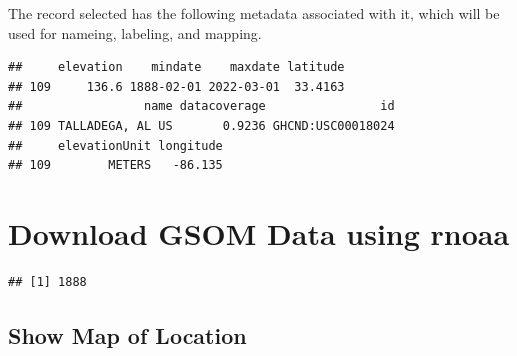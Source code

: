 \documentclass{article}\usepackage[]{graphicx}\usepackage[]{color}
\makeatletter
\newenvironment{kframe}{%
 \def\at@end@of@kframe{}%
 \ifinner\ifhmode%
  \def\at@end@of@kframe{\end{minipage}}%
  \begin{minipage}{\columnwidth}%
 \fi\fi%
 \def\FrameCommand##1{\hskip\@totalleftmargin \hskip-\fboxsep
 \colorbox{shadecolor}{##1}\hskip-\fboxsep
     \hskip-\linewidth \hskip-\@totalleftmargin \hskip\columnwidth}%
 \MakeFramed {\advance\hsize-\width
   \@totalleftmargin\z@ \linewidth\hsize
   \@setminipage}}%
 {\par\unskip\endMakeFramed%
 \at@end@of@kframe}
\newenvironment{knitrout}{}{} %
\makeatother
\begin{document}
The record selected has the following metadata associated with it, which will be used for nameing, labeling, and mapping. 

\begin{knitrout}
\color{fgcolor}\begin{kframe}
\begin{verbatim}
##     elevation    mindate    maxdate latitude
## 109     136.6 1888-02-01 2022-03-01  33.4163
##                 name datacoverage                id
## 109 TALLADEGA, AL US       0.9236 GHCND:USC00018024
##     elevationUnit longitude
## 109        METERS   -86.135
\end{verbatim}
\end{kframe}
\end{knitrout}

\section{Download GSOM Data using rnoaa}

\begin{knitrout}
\color{fgcolor}\begin{kframe}
\begin{verbatim}
## [1] 1888
\end{verbatim}
\end{kframe}
\end{knitrout}

\subsection{Show Map of Location}
\end{document}
